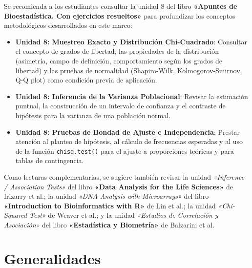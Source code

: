 \documentclass[
  spanish,
  letterpaper,
  DIV=11,
  numbers=noendperiod]{scrreprt}
\providecommand{\tightlist}{%
  \setlength{\itemsep}{0pt}\setlength{\parskip}{0pt}}
\begin{document}
\begin{tcolorbox}[enhanced jigsaw, arc=.35mm, bottomrule=.15mm, bottomtitle=1mm, breakable, colback=white, colbacktitle=quarto-callout-important-color!10!white, colframe=quarto-callout-important-color-frame, coltitle=black, left=2mm, leftrule=.75mm, opacityback=0, opacitybacktitle=0.6, rightrule=.15mm, title=\textcolor{quarto-callout-important-color}{\faExclamation}\hspace{0.5em}{Lectura Sugerida para el Trabajo Práctico}, titlerule=0mm, toprule=.15mm, toptitle=1mm]

Se recomienda a los estudiantes consultar la unidad 8 del libro
\textbf{«Apuntes de Bioestadística. Con ejercicios resueltos»} para
profundizar los conceptos metodológicos desarrollados en este marco:

\begin{itemize}
\tightlist
\item
  \textbf{Unidad 8: Muestreo Exacto y Distribución Chi-Cuadrado}:
  Consultar el concepto de grados de libertad, las propiedades de la
  distribución (asimetría, campo de definición, comportamiento según los
  grados de libertad) y las pruebas de normalidad (Shapiro-Wilk,
  Kolmogorov-Smirnov, Q-Q plot) como condición previa de aplicación.
\item
  \textbf{Unidad 8: Inferencia de la Varianza Poblacional}: Revisar la
  estimación puntual, la construcción de un intervalo de confianza y el
  contraste de hipótesis para la varianza de una población normal.
\item
  \textbf{Unidad 8: Pruebas de Bondad de Ajuste e Independencia}:
  Prestar atención al planteo de hipótesis, al cálculo de frecuencias
  esperadas y al uso de la función \texttt{chisq.test()} para el ajuste
  a proporciones teóricas y para tablas de contingencia.
\end{itemize}

Como lecturas complementarias, se sugiere también revisar la unidad
\emph{«Inference / Association Tests»} del libro \textbf{«Data Analysis
for the Life Sciences»} de Irizarry et al.; la unidad \emph{«DNA
Analysis with Microarrays»} del libro \textbf{«Introduction to
Bioinformatics with R»} de Lin et al.; la unidad \emph{«Chi-Squared
Test»} de Weaver et al.; y la unidad \emph{«Estudios de Correlación y
Asociación»} del libro \textbf{«Estadística y Biometría»} de Balzarini
et al.

\end{tcolorbox}

\section{Generalidades}\label{generalidades-4}
\end{document}
